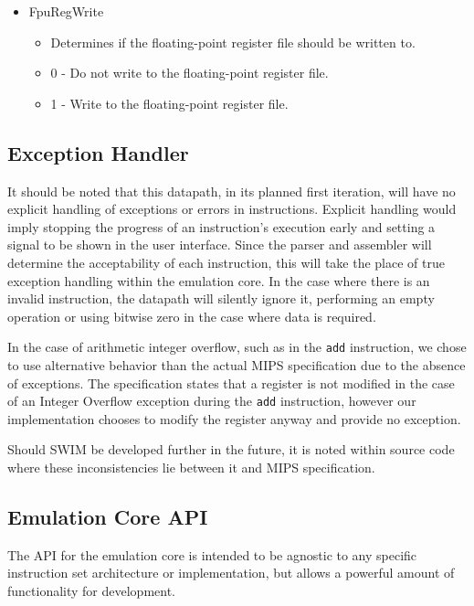 \documentclass[
    paper=letter,
    parskip=half,
    fontsize=12pt,
    titlepage=firstiscover,
    toc=bibliography,
    numbers=endperiod
]{scrartcl}
\providecommand{\tightlist}{%
  \setlength{\itemsep}{0pt}\setlength{\parskip}{0pt}}
\begin{document}
\begin{itemize}
    \item FpuRegWrite
          \begin{itemize}
              \tightlist
              \item Determines if the floating-point register file should be written to.
              \item 0 - Do not write to the floating-point register file.
              \item 1 - Write to the floating-point register file.
          \end{itemize}
\end{itemize}

\subsection{Exception Handler}

It should be noted that this datapath, in its planned first iteration,
will have no explicit handling of exceptions or errors in instructions.
Explicit handling would imply stopping the progress of an instruction's
execution early and setting a signal to be shown in the user interface.
Since the parser and assembler will determine the acceptability of each
instruction, this will take the place of true exception handling within
the emulation core. In the case where there is an invalid instruction,
the datapath will silently ignore it, performing an empty operation or
using bitwise zero in the case where data is required.

In the case of arithmetic integer overflow, such as in the \texttt{add}
instruction, we chose to use alternative behavior than the actual MIPS
specification due to the absence of exceptions. The specification states
that a register is not modified in the case of an Integer Overflow
exception during the \texttt{add} instruction, however our
implementation chooses to modify the register anyway and provide no
exception.

Should SWIM be developed further in the future, it is noted within
source code where these inconsistencies lie between it and MIPS
specification.

\subsection{Emulation Core API}
\label{subsec:emulation-core-api}

The API for the emulation core is intended to be agnostic to any
specific instruction set architecture or implementation, but allows a
powerful amount of functionality for development.
\end{document}
